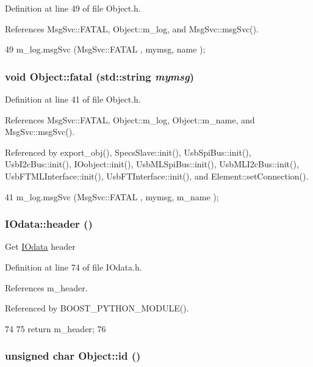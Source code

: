 Definition at line 49 of file Object.h.

References MsgSvc::FATAL, Object::m\_\-log, and MsgSvc::msgSvc().


\begin{DoxyCode}
49 { m_log.msgSvc (MsgSvc::FATAL   , mymsg, name ); }
\end{DoxyCode}
\hypertarget{classObject_aad5a16aac7516ce65bd5ec02ab07fc80}{
\subsubsection[{fatal}]{\setlength{\rightskip}{0pt plus 5cm}void Object::fatal (std::string {\em mymsg})}}
\label{classObject_aad5a16aac7516ce65bd5ec02ab07fc80}


Definition at line 41 of file Object.h.

References MsgSvc::FATAL, Object::m\_\-log, Object::m\_\-name, and MsgSvc::msgSvc().

Referenced by export\_\-obj(), SpecsSlave::init(), UsbSpiBus::init(), UsbI2cBus::init(), IOobject::init(), UsbMLSpiBus::init(), UsbMLI2cBus::init(), UsbFTMLInterface::init(), UsbFTInterface::init(), and Element::setConnection().


\begin{DoxyCode}
41 { m_log.msgSvc (MsgSvc::FATAL   , mymsg, m_name ); }
\end{DoxyCode}
\hypertarget{classIOdata_a503396d8deb6e098c15f963e4201e01b}{
\subsubsection[{header}]{ IOdata::header ()}}
\label{classIOdata_a503396d8deb6e098c15f963e4201e01b}
Get \hyperlink{classIOdata}{IOdata} header 

Definition at line 74 of file IOdata.h.

References m\_\-header.

Referenced by BOOST\_\-PYTHON\_\-MODULE().


\begin{DoxyCode}
74               {
75     return m_header;
76   }
\end{DoxyCode}
\hypertarget{classObject_af99145335cc61ff6e2798ea17db009d2}{
\subsubsection[{id}]{\setlength{\rightskip}{0pt plus 5cm}unsigned char Object::id ()}}
\label{classObject_af99145335cc61ff6e2798ea17db009d2}


